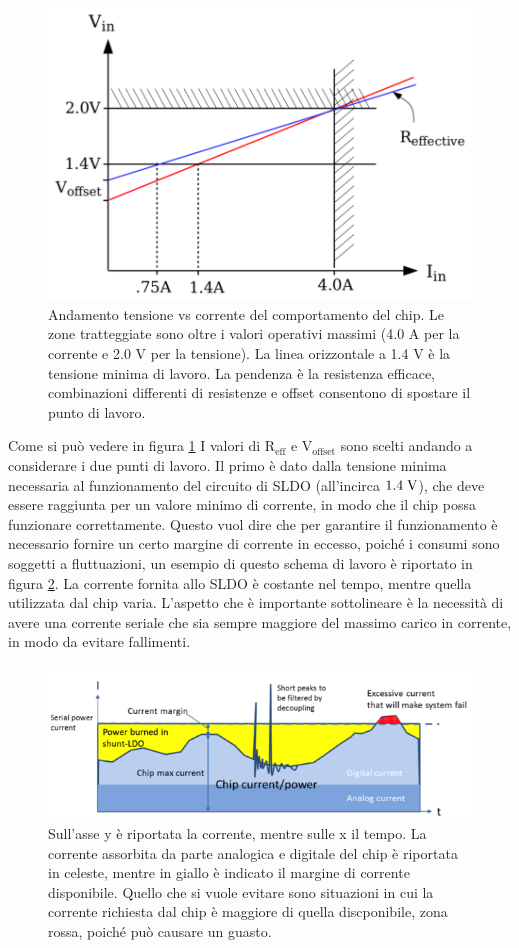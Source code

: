 \begin{figure}
\centering
\includegraphics[scale=.3]{Immagini/VoltageVsCurrent}
\caption{Andamento tensione vs corrente del comportamento del chip. Le zone tratteggiate sono oltre i valori operativi massimi (4.0 A per la corrente e 2.0 V per la tensione). La linea orizzontale a 1.4 V è la tensione minima di lavoro. La pendenza è la resistenza efficace, combinazioni differenti di resistenze e offset consentono di spostare il punto di lavoro.}
\label{VVC}
\end{figure}
Come si può vedere in figura \ref{VVC} I valori di $\mathrm{R_{eff}}$ e $\mathrm{V_{offset}}$ sono scelti andando a considerare i due punti di lavoro. Il primo è dato dalla tensione minima necessaria al funzionamento del circuito di SLDO (all'incirca $1.4 \rm \; V$), che deve essere raggiunta per un valore minimo di corrente, in modo che il chip possa funzionare correttamente. Questo vuol dire che per garantire il funzionamento è necessario fornire un certo margine di corrente in eccesso, poiché i consumi sono soggetti a fluttuazioni, un esempio di questo schema di lavoro è riportato in figura \ref{SLDOprinciple}. La corrente fornita allo SLDO è costante nel tempo, mentre quella utilizzata dal chip varia. L'aspetto che è importante sottolineare è la necessità di avere una corrente seriale che sia sempre maggiore del massimo carico in corrente, in modo da evitare fallimenti.
\begin{figure}
\centering
\includegraphics[scale=.5]{Immagini/ShuntRegulatorPrinciple}
\caption{Sull'asse y è riportata la corrente, mentre sulle x il tempo. La corrente assorbita da parte analogica e digitale del chip è riportata in celeste, mentre in giallo è indicato il margine di corrente disponibile. Quello che si vuole evitare sono situazioni in cui la corrente richiesta dal chip è maggiore di quella discponibile, zona rossa, poiché può causare un guasto.}
\label{SLDOprinciple}
\end{figure}
